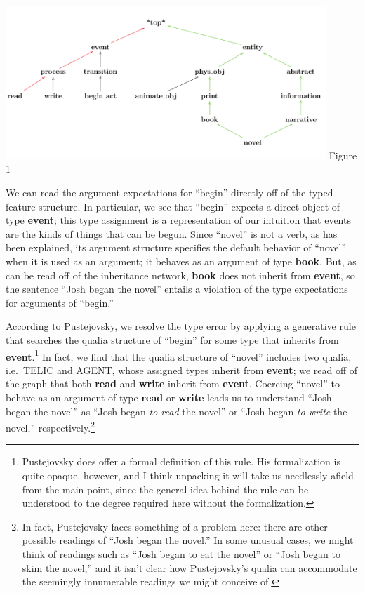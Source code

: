 \begin{center}
\includegraphics[width=4.75in]{InheritanceNetwork}
\vspace{3mm}
Figure 1
\end{center}

We can read the argument expectations for ``begin'' directly off of the typed feature structure. In particular, we see that ``begin'' expects a direct object of type {\bf event}; this type assignment is a representation of our intuition that events are the kinds of things that can be begun. Since ``novel'' is not a verb, as has been explained, its argument structure specifies the default behavior of ``novel'' when it is used as an argument; it behaves as an argument of type {\bf book}. But, as can be read off of the inheritance network, {\bf book} does not inherit from {\bf event}, so the sentence ``Josh began the novel'' entails a violation of the type expectations for arguments of ``begin.''

According to Pustejovsky, we resolve the type error by applying a generative rule that searches the qualia structure of ``begin'' for some type that inherits from {\bf event}.\footnote{Pustejovsky does offer a formal definition of this rule. His formalization is quite opaque, however, and I think unpacking it will take us needlessly afield from the main point, since the general idea behind the rule can be understood to the degree required here without the formalization.} In fact, we find that the qualia structure of ``novel'' includes two qualia, i.e.\ TELIC and AGENT, whose assigned types inherit from {\bf event}; we read off of the graph that both {\bf read} and {\bf write} inherit from {\bf event}. Coercing ``novel'' to behave as an argument of type {\bf read} or {\bf write} leads us to understand ``Josh began the novel'' as ``Josh began \emph{to read} the novel'' or ``Josh began \emph{to write} the novel,'' respectively.\footnote{In fact, Pustejovsky faces something of a problem here: there are other possible readings of ``Josh began the novel.'' In some unusual cases, we might think of readings such as ``Josh began to eat the novel'' or ``Josh began to skim the novel,'' and it isn't clear how Pustejovsky's qualia can accommodate the seemingly innumerable readings we might conceive of.}

